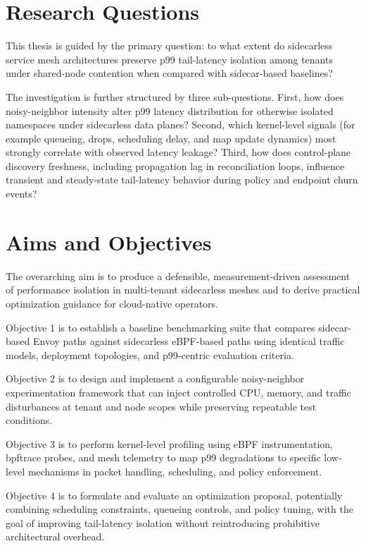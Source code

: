 \documentclass[12pt,a4paper]{article}
\begin{document}
\section{Research Questions}
This thesis is guided by the primary question: to what extent do sidecarless service mesh architectures preserve p99 tail-latency isolation among tenants under shared-node contention when compared with sidecar-based baselines?

The investigation is further structured by three sub-questions. First, how does noisy-neighbor intensity alter p99 latency distribution for otherwise isolated namespaces under sidecarless data planes? Second, which kernel-level signals (for example queueing, drops, scheduling delay, and map update dynamics) most strongly correlate with observed latency leakage? Third, how does control-plane discovery freshness, including propagation lag in reconciliation loops, influence transient and steady-state tail-latency behavior during policy and endpoint churn events?

\section{Aims and Objectives}
The overarching aim is to produce a defensible, measurement-driven assessment of performance isolation in multi-tenant sidecarless meshes and to derive practical optimization guidance for cloud-native operators.

Objective 1 is to establish a baseline benchmarking suite that compares sidecar-based Envoy paths against sidecarless eBPF-based paths using identical traffic models, deployment topologies, and p99-centric evaluation criteria.

Objective 2 is to design and implement a configurable noisy-neighbor experimentation framework that can inject controlled CPU, memory, and traffic disturbances at tenant and node scopes while preserving repeatable test conditions.

Objective 3 is to perform kernel-level profiling using eBPF instrumentation, bpftrace probes, and mesh telemetry to map p99 degradations to specific low-level mechanisms in packet handling, scheduling, and policy enforcement.

Objective 4 is to formulate and evaluate an optimization proposal, potentially combining scheduling constraints, queueing controls, and policy tuning, with the goal of improving tail-latency isolation without reintroducing prohibitive architectural overhead.
\end{document}
